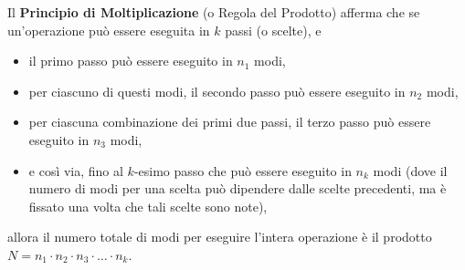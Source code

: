 \noindent Il \textbf{Principio di Moltiplicazione} (o Regola del Prodotto) afferma che se un'operazione può essere eseguita in $k$ passi (o scelte), e
\begin{itemize}
    \item il primo passo può essere eseguito in $n_1$ modi,
    \item per ciascuno di questi modi, il secondo passo può essere eseguito in $n_2$ modi,
    \item per ciascuna combinazione dei primi due passi, il terzo passo può essere eseguito in $n_3$ modi,
    \item e così via, fino al $k$-esimo passo che può essere eseguito in $n_k$ modi (dove il numero di modi per una scelta può dipendere dalle scelte precedenti, ma è fissato una volta che tali scelte sono note),
\end{itemize}
allora il numero totale di modi per eseguire l'intera operazione è il prodotto $N = n_1 \cdot n_2 \cdot n_3 \cdot \dots \cdot n_k$.

